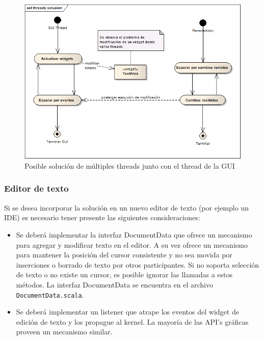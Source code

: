 \documentclass[12pt,a4paper]{article}
\begin{document}
	\begin{figure}[!ht]
		\begin{center}
			\includegraphics[width=14cm]{threads-gui-solucion.png}
			\caption{\label{threads-gui-solucion} Posible solución de múltiples threads junto con el thread de la GUI }
		\end{center}
	\end{figure}

\subsubsection{Editor de texto}
Si se desea incorporar la solución en un nuevo editor de texto (por ejemplo un IDE) es necesario tener presente 
las siguientes consideraciones:

	\begin{itemize}
		\item Se deberá implementar la interfaz DocumentData que ofrece un mecanismo para agregar y modificar texto en el editor. 
		A su vez ofrece un mecanismo para mantener la posición del cursor consistente y no sea movida por inserciones o
		borrado de texto por otros participantes. Si no soporta selección de texto o no existe un cursor, es posible ignorar
		las llamadas a estos métodos.
		La interfaz DocumentData se encuentra en el archivo \texttt{DocumentData.scala}.
		\item  Se deberá implementar un listener que atrape los eventos del widget de edición de texto y los propague al kernel.
		La mayoría de las API’s gráficas proveen un mecanismo similar.
	\end{itemize}
\end{document}
